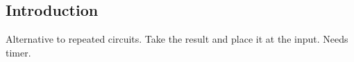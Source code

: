 
\subsection{Introduction}

Alternative to repeated circuits. Take the result and place it at the input. Needs timer.
